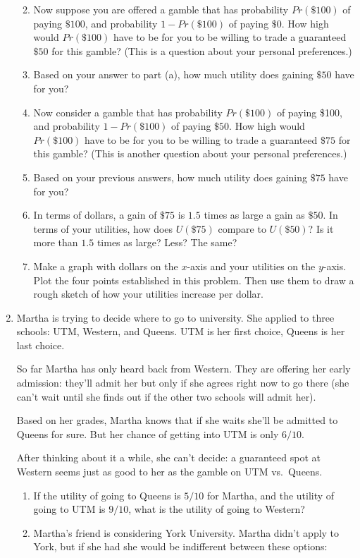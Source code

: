 \documentclass[justified]{tufte-book}
\providecommand{\tightlist}{%
  \setlength{\itemsep}{0pt}\setlength{\parskip}{0pt}}
\renewcommand{\u}{U}
\newcommand{\p}{Pr}
\theoremstyle{definition}
\theoremstyle{definition}
\theoremstyle{definition}
\theoremstyle{definition}
\theoremstyle{remark}
\begin{document}
\begin{enumerate}
  \begin{enumerate}
  \def\labelenumii{\alph{enumii}.}
  \tightlist
  \item
    Now suppose you are offered a gamble that has probability \(\p(\$100)\) of paying \(\$100\), and probability \(1-\p(\$100)\) of paying \(\$0\). How high would \(\p(\$100)\) have to be for you to be willing to trade a guaranteed \(\$50\) for this gamble? (This is a question about your personal preferences.)
  \item
    Based on your answer to part (a), how much utility does gaining \(\$50\) have for you?
  \item
    Now consider a gamble that has probability \(\p(\$100)\) of paying \$100, and probability \(1-\p(\$100)\) of paying \(\$50\). How high would \(\p(\$100)\) have to be for you to be willing to trade a guaranteed \(\$75\) for this gamble? (This is another question about your personal preferences.)
  \item
    Based on your previous answers, how much utility does gaining \(\$75\) have for you?
  \item
    In terms of dollars, a gain of \(\$75\) is \(1.5\) times as large a gain as \(\$50\). In terms of your utilities, how does \(\u(\$75)\) compare to \(\u(\$50)\)? Is it more than \(1.5\) times as large? Less? The same?
  \item
    Make a graph with dollars on the \(x\)-axis and your utilities on the \(y\)-axis. Plot the four points established in this problem. Then use them to draw a rough sketch of how your utilities increase per dollar.
  \end{enumerate}
\item
  Martha is trying to decide where to go to university. She applied to three schools: UTM, Western, and Queens. UTM is her first choice, Queens is her last choice.

  So far Martha has only heard back from Western. They are offering her early admission: they'll admit her but only if she agrees right now to go there (she can't wait until she finds out if the other two schools will admit her).

  Based on her grades, Martha knows that if she waits she'll be admitted to Queens for sure. But her chance of getting into UTM is only \(6/10\).

  After thinking about it a while, she can't decide: a guaranteed spot at Western seems just as good to her as the gamble on UTM vs.~Queens.

  \begin{enumerate}
  \def\labelenumii{\alph{enumii}.}
  \item
    If the utility of going to Queens is \(5/10\) for Martha, and the utility of going to UTM is \(9/10\), what is the utility of going to Western?
  \item
    Martha's friend is considering York University. Martha didn't apply to York, but if she had she would be indifferent between these options:


\end{enumerate}
\end{enumerate}
\end{document}
